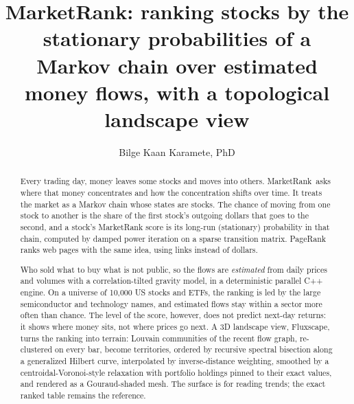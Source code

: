 \documentclass[preprint,3p,twocolumn]{elsarticle}
\newcommand{\MR}{MarketRank}
\newcommand{\FS}{Fluxscape}
\begin{document}
\begin{frontmatter}

\title{MarketRank: ranking stocks by the stationary probabilities of a Markov chain over estimated money flows, with a topological landscape view}

\author{Bilge Kaan Karamete, PhD}

\address{Graph AI LLC\\ \url{https://graphAiPortal.com}}

\begin{abstract}
Every trading day, money leaves some stocks and moves into others. \MR\ asks where that money concentrates and how the concentration shifts over time. It treats the market as a Markov chain whose states are stocks. The chance of moving from one stock to another is the share of the first stock's outgoing dollars that goes to the second, and a stock's MarketRank score is its long-run (stationary) probability in that chain, computed by damped power iteration on a sparse transition matrix. PageRank ranks web pages with the same idea, using links instead of dollars.

Who sold what to buy what is not public, so the flows are \emph{estimated} from daily prices and volumes with a correlation-tilted gravity model, in a deterministic parallel C++ engine. On a universe of 10{,}000 US stocks and ETFs, the ranking is led by the large semiconductor and technology names, and estimated flows stay within a sector more often than chance. The level of the score, however, does not predict next-day returns: it shows where money sits, not where prices go next. A 3D landscape view, \FS, turns the ranking into terrain: Louvain communities of the recent flow graph, re-clustered on every bar, become territories, ordered by recursive spectral bisection along a generalized Hilbert curve, interpolated by inverse-distance weighting, smoothed by a centroidal-Voronoi-style relaxation with portfolio holdings pinned to their exact values, and rendered as a Gouraud-shaded mesh. The surface is for reading trends; the exact ranked table remains the reference.


\end{abstract}
\end{frontmatter}
\end{document}
